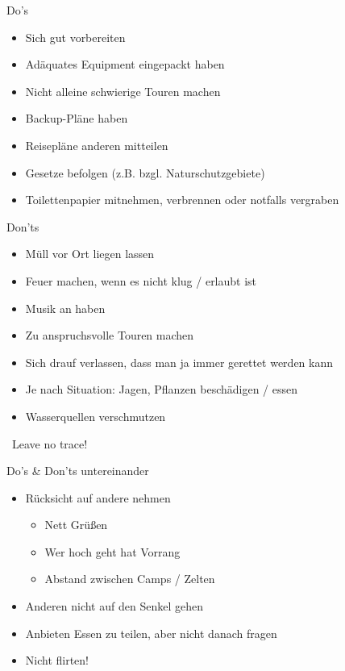 \documentclass[aspectratio=169]{beamer}
\begin{document}
			\begin{frame}{Do's}
				\begin{itemize}
					\item Sich gut vorbereiten
					\item Adäquates Equipment eingepackt haben
					\item Nicht alleine schwierige Touren machen
					\item Backup-Pläne haben
					\item Reisepläne anderen mitteilen
					\item Gesetze befolgen (z.B. bzgl. Naturschutzgebiete)
					\item Toilettenpapier mitnehmen, verbrennen oder notfalls vergraben
				\end{itemize}
			\end{frame}
			
			\begin{frame}{Don'ts}
				\begin{itemize}
					\item Müll vor Ort liegen lassen
					\item Feuer machen, wenn es nicht klug / erlaubt ist
					\item Musik an haben
					\item Zu anspruchsvolle Touren machen
					\item Sich drauf verlassen, dass man ja immer gerettet werden kann
					\item Je nach Situation: Jagen, Pflanzen beschädigen / essen
					\item Wasserquellen verschmutzen
				\end{itemize}
				\pause
				\vspace{0.2cm}
				\textcolor{blue}{\textrightarrow}\ Leave no trace!
			\end{frame}
			
			\begin{frame}{Do's \& Don'ts untereinander}
				\begin{itemize}
					\item Rücksicht auf andere nehmen
					\begin{itemize}
						\item Nett Grüßen
						\item Wer hoch geht hat Vorrang
						\item Abstand zwischen Camps / Zelten
					\end{itemize}
					\item Anderen nicht auf den Senkel gehen
					\item Anbieten Essen zu teilen, aber nicht danach fragen
					\item Nicht flirten!
				\end{itemize}
			\end{frame}
			
\end{document}

